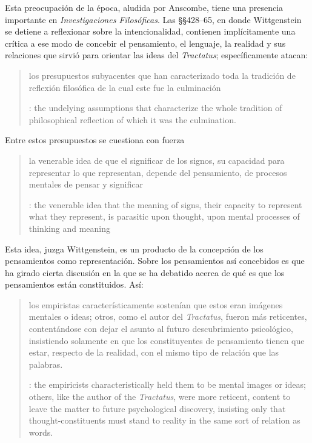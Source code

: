 Esta preocupación de la época, aludida por Anscombe, tiene una presencia importante en \emph{Investigaciones Filosóficas}. Las \S\S428--65, en donde Wittgenstein se detiene a reflexionar sobre la intencionalidad, contienen implícitamente una crítica a ese modo de concebir el pensamiento, el lenguaje, la realidad y sus relaciones que sirvió para orientar las ideas del \emph{Tractatus}; específicamente atacan: \blockquote[{\cite[3]{hacker2000mind}}: the undelying assumptions that characterize the whole tradition of philosophical reflection of which it was the culmination.]{los presupuestos subyacentes que han caracterizado toda la tradición de reflexión filosófica de la cual este fue la culminación}. Entre estos presupuestos se cuestiona con fuerza \blockquote[{\cite[3]{hacker2000mind}}: the venerable idea that the meaning of signs, their capacity to represent what they represent, is parasitic upon thought, upon mental processes of thinking and meaning]{la venerable idea de que el significar de los signos, su capacidad para representar lo que representan, depende del pensamiento, de procesos mentales de pensar y significar}. Esta idea, juzga Wittgenstein, es un producto de la concepción de los pensamientos como representación. Sobre los pensamientos así concebidos es que ha girado cierta discusión en la que se ha debatido acerca de qué es que los pensamientos están constituidos. Así: \blockquote[{\cite[3]{hacker2000mind}}: the empiricists characteristically held them to be mental images or ideas; others, like the author of the \emph{Tractatus}, were more reticent, content to leave the matter to future psychological discovery, insisting only that thought-constituents must stand to reality in the same sort of relation as words.]{los empiristas característicamente sostenían que estos eran imágenes mentales o ideas; otros, como el autor del \emph{Tractatus}, fueron más reticentes, contentándose con dejar el asunto al futuro descubrimiento psicológico, insistiendo solamente en que los constituyentes de pensamiento tienen que estar, respecto de la realidad, con el mismo tipo de relación que las palabras.}

